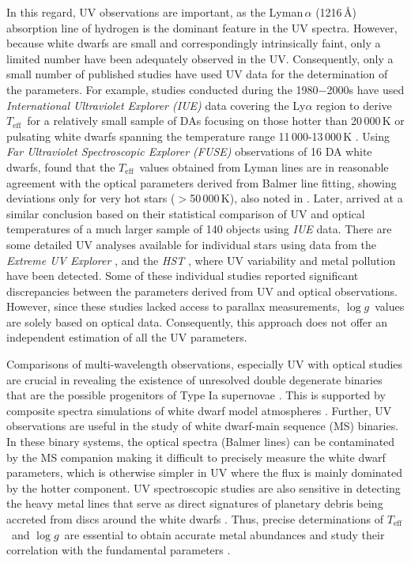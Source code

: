 \documentclass[fleqn,usenatbib, useAMS]{mnras}
\newcommand{\Teff}{\mbox{$T_{\mathrm{eff}}$}}
\newcommand{\logg}{\mbox{$\log g$}}
\begin{document}
In this regard, UV observations are important, as the Lyman\,$\alpha$ (1216\,\AA) absorption line of hydrogen is the dominant feature in the UV spectra.
However, because white dwarfs are small and correspondingly intrinsically faint, only a limited number have been adequately observed in the UV. Consequently, only a small number of published studies have used UV data for the determination of the parameters.
For example, studies conducted during the 1980$-$2000s have used \textit{International Ultraviolet Explorer (IUE)} data covering the Ly$\alpha$ region to derive \Teff\ for a relatively small sample of DAs focusing on those hotter than 20\,000\,K \citep{Holberg1986} or pulsating white dwarfs spanning the temperature range 11\,000-13\,000\,K \citep{Kepler1993, Bergeron1995}. Using \textit{Far Ultraviolet Spectroscopic Explorer (FUSE)} observations of 16 DA white dwarfs, \cite{Barstow2003} found that the \Teff\ values obtained from Lyman lines are in reasonable agreement with the optical parameters derived from Balmer line fitting, showing deviations only for very hot stars ($>$50\,000\,K), also noted in \cite{Good2004}. Later, \cite{Lajoie2007} arrived at a similar conclusion based on their statistical comparison of UV and optical temperatures of a much larger sample of 140 objects using \textit{IUE} data. There are some detailed UV analyses available for individual stars using data from the \textit{Extreme UV Explorer} \citep{Dupuis2000}, and the \textit{HST} \citep{Koester2014, Wilson2019}, where UV variability and metal pollution have been detected. Some of these individual studies reported significant discrepancies between the parameters derived from UV and optical observations. However, since these studies lacked access to parallax measurements, \logg\ values are solely based on optical data. Consequently, this approach does not offer an independent estimation of all the UV parameters. 

Comparisons of multi-wavelength observations, especially UV with optical studies are crucial in revealing the existence of unresolved double degenerate binaries that are the possible progenitors of Type Ia supernovae \citep{Lajoie2007, 2015MNRAS.450.3966B, Wall2023}. This is supported by composite spectra simulations of white dwarf model atmospheres \citep{Lajoie2007, Tremblay2011}. Further, UV observations are useful in the study of white dwarf-main sequence (MS) binaries. In these binary systems, the optical spectra (Balmer lines) can be contaminated by the MS companion making it difficult to precisely measure the white dwarf parameters, which is otherwise simpler in UV where the flux is mainly dominated by the hotter component. UV spectroscopic studies are also sensitive in detecting the heavy metal lines that serve as direct signatures of planetary debris being accreted from discs around the white dwarfs \citep{boris2012,farihi2013}. Thus, precise determinations of \Teff\ and \logg\ are essential to obtain accurate metal abundances and study their correlation with the fundamental parameters \citep[\Teff, mass, and cooling age;][]{Koester2014}.
\end{document}
